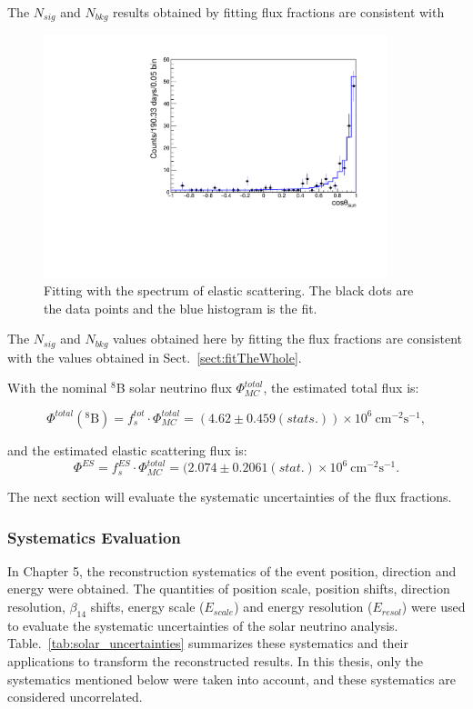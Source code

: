 The $N_{sig}$ and $N_{bkg}$ results obtained by fitting flux fractions are consistent with

\begin{figure}[!htb]
	\centering
	\includegraphics[width=10cm]{ESfluxFit.pdf}
	\caption[Fitting with the spectrum of elastic scattering.]{Fitting with the spectrum of elastic scattering. The black dots are the data points and the blue histogram is the fit.}
	\label{fig:ESfluxFit}
\end{figure}

The $N_{sig}$ and $N_{bkg}$ values obtained here by fitting the flux fractions are consistent with the values obtained in Sect.~\ref{sect:fitTheWhole}.

With the nominal $^8$B solar neutrino flux $\Phi^{total}_{MC}$, the estimated total flux is:

\begin{equation}
\Phi^{total}(\mathrm{^8 B})=f^{tot}_s\cdot \Phi^{total}_{MC}=(4.62 \pm 0.459(stats.))\times 10^6~\mathrm{cm^{-2}s^{-1}},
\end{equation}

and the estimated elastic scattering flux is:
\begin{equation}
\Phi^{ES}=f^{ES}_s\cdot \Phi^{total}_{MC}=( 2.074\pm 0.2061(stat.)\times 10^6~\mathrm{cm^{-2}s^{-1}}.
\end{equation}

The next section will evaluate the systematic uncertainties of the flux fractions.

\subsubsection{Systematics Evaluation}
In Chapter 5, the reconstruction systematics of the event position, direction and energy were obtained. The quantities of position scale, position shifts, direction resolution, $\beta_{14}$ shifts, energy scale ($E_{scale}$) and energy resolution ($E_{resol}$) were used to evaluate the systematic uncertainties of the solar neutrino analysis. Table.~\ref{tab:solar_uncertainties} summarizes these systematics and their applications to transform the reconstructed results. In this thesis, only the systematics mentioned below were taken into account, and these systematics are considered uncorrelated. 

